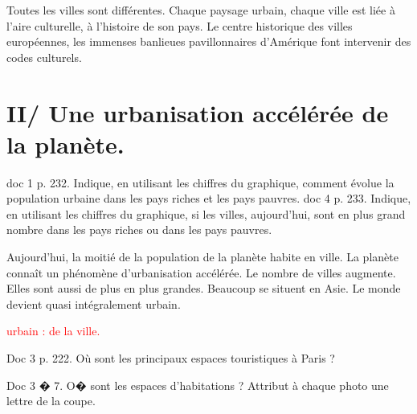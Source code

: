 \documentclass{beamer}
\begin{document}
Toutes les villes sont différentes. Chaque paysage urbain, chaque ville est liée à l'aire culturelle, à l'histoire de son pays. Le centre historique des villes européennes, les immenses banlieues pavillonnaires d'Amérique font intervenir des codes culturels.


\section{II/ Une urbanisation accélérée de la planète.}

doc 1 p. 232. Indique, en utilisant les chiffres du graphique, comment évolue la population urbaine dans les pays riches et les pays pauvres.
doc 4 p. 233. Indique, en utilisant les chiffres du graphique, si les villes, aujourd'hui, sont en plus grand nombre dans les pays riches ou dans les pays pauvres.

Aujourd'hui, la moitié de la population de la planète habite en ville. La planète connaît un phénomène d'urbanisation accélérée. Le nombre de villes augmente. Elles sont aussi de plus en plus grandes. Beaucoup se situent en Asie. Le monde devient quasi intégralement urbain.



\textcolor{red}{urbain : de la ville.}

Doc 3 p. 222.
Où sont les principaux espaces touristiques à Paris ?

Doc 3 � 7.
O� sont les espaces d'habitations ? Attribut à chaque photo une lettre de la coupe.


  
\end{document}
